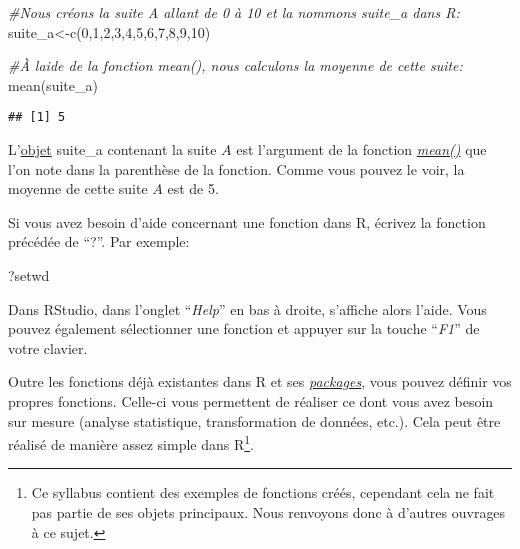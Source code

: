 \documentclass[
]{book}
\newenvironment{Shaded}{\begin{snugshade}}{\end{snugshade}}
\newcommand{\CommentTok}[1]{\textcolor[rgb]{0.56,0.35,0.01}{\textit{#1}}}
\newcommand{\DecValTok}[1]{\textcolor[rgb]{0.00,0.00,0.81}{#1}}
\newcommand{\FunctionTok}[1]{\textcolor[rgb]{0.00,0.00,0.00}{#1}}
\newcommand{\NormalTok}[1]{#1}
\newcommand{\OtherTok}[1]{\textcolor[rgb]{0.56,0.35,0.01}{#1}}
\begin{document}
\begin{Shaded}
\begin{Highlighting}[]
\CommentTok{\#Nous créons la suite A allant de 0 à 10 et la nommons suite\_a dans R:}
\NormalTok{suite\_a}\OtherTok{\textless{}{-}}\FunctionTok{c}\NormalTok{(}\DecValTok{0}\NormalTok{,}\DecValTok{1}\NormalTok{,}\DecValTok{2}\NormalTok{,}\DecValTok{3}\NormalTok{,}\DecValTok{4}\NormalTok{,}\DecValTok{5}\NormalTok{,}\DecValTok{6}\NormalTok{,}\DecValTok{7}\NormalTok{,}\DecValTok{8}\NormalTok{,}\DecValTok{9}\NormalTok{,}\DecValTok{10}\NormalTok{)}

\CommentTok{\#À l\textquotesingle{}aide de la fonction mean(), nous calculons la moyenne de cette suite:}
\FunctionTok{mean}\NormalTok{(suite\_a)}
\end{Highlighting}
\end{Shaded}

\begin{verbatim}
## [1] 5
\end{verbatim}

L'\protect\hyperlink{objets_envir}{objet} suite\_a contenant la suite \(A\) est l'argument de la fonction \href{https://www.rdocumentation.org/packages/base/versions/3.6.2/topics/mean}{\emph{mean()}} que l'on note dans la parenthèse de la fonction. Comme vous pouvez le voir, la moyenne de cette suite \(A\) est de 5.

Si vous avez besoin d'aide concernant une fonction dans R, écrivez la fonction précédée de ``?''. Par exemple:

\begin{Shaded}
\begin{Highlighting}[]
\NormalTok{?setwd}
\end{Highlighting}
\end{Shaded}

Dans RStudio, dans l'onglet ``\emph{Help}'' en bas à droite, s'affiche alors l'aide. Vous pouvez également sélectionner une fonction et appuyer sur la touche ``\emph{F1}'' de votre clavier.

Outre les fonctions déjà existantes dans R et ses \protect\hyperlink{packages}{\emph{packages}}, vous pouvez définir vos propres fonctions. Celle-ci vous permettent de réaliser ce dont vous avez besoin sur mesure (analyse statistique, transformation de données, etc.). Cela peut être réalisé de manière assez simple dans R\footnote{Ce syllabus contient des exemples de fonctions créés, cependant cela ne fait pas partie de ses objets principaux. Nous renvoyons donc à d'autres ouvrages à ce sujet.}.
\end{document}
